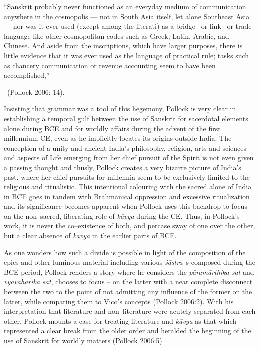 \begin{myquote}
“Sanskrit probably never functioned as an everyday medium of communication anywhere in the cosmopolis — not in South Asia itself, let alone Southeast Asia — nor was it ever used (except among the literati) as a bridge– or link– or trade language like other cosmopolitan codes such as Greek, Latin, Arabic, and Chinese. And aside from the inscriptions, which have larger purposes, there is little evidence that it was ever used as the language of practical rule; tasks such as chancery communication or revenue accounting seem to have been accomplished,” 

~\hfill (Pollock 2006: 14).
\end{myquote}

Insisting that grammar was a tool of this hegemony, Pollock is very clear in establishing a temporal gulf between the use of Sanskrit for sacerdotal elements alone during BCE and for worldly affairs during the advent of the first millennium CE, even as he implicitly locates its origins outside India. The conception of a unity and ancient India’s philosophy, religion, arts and sciences and aspects of Life emerging from her chief pursuit of the Spirit is not even given a passing thought and thusly, Pollock creates a very bizarre picture of India’s past, where her chief pursuits for millennia seem to be exclusively limited to the religious and ritualistic. This intentional colouring with the sacred alone of India in BCE goes in tandem with Brahmanical oppression and excessive ritualization and its significance becomes apparent when Pollock uses this backdrop to focus on the non–sacred, liberating role of \textit{kāvya} during the CE. Thus, in Pollock’s work, it is never the co–existence of both, and percase sway of one over the other, but a clear absence of \textit{kāvya} in the earlier parts of BCE.

As one wonders how such a divide is possible in light of the composition of the epics and other luminous material including various \textit{śāstra}–s composed during the BCE period, Pollock renders a story where he considers the \textit{pāramārthika sat} and \textit{vyāvahārika sat}, chooses to focus – on the latter with a near complete disconnect between the two to the point of not admitting any influence of the former on the latter, while comparing them to Vico’s concepts (Pollock 2006:2). With his interpretation that literature and non–literature were acutely separated from each other, Pollock mounts a case for treating literature and \textit{kāvya} as that which represented a clear break from the older order and heralded the beginning of the use of Sanskrit for worldly matters (Pollock 2006:5)

